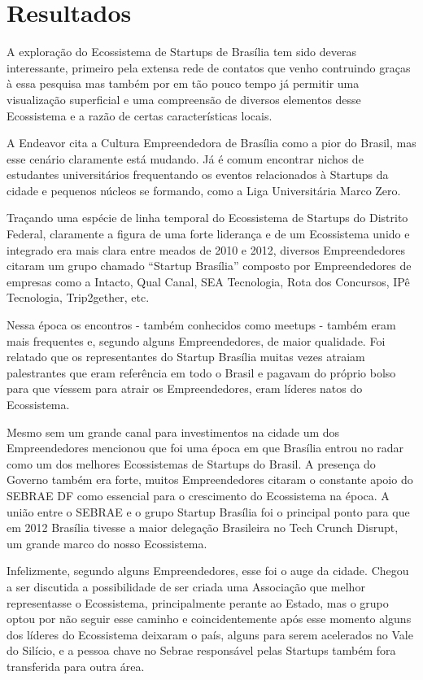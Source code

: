 \chapter[Resultados]{Resultados}
\label{cap-resultados}

A exploração do Ecossistema de Startups de Brasília tem sido deveras interessante, primeiro pela extensa rede de contatos que venho contruindo graças à essa pesquisa mas também por em tão pouco tempo já permitir uma visualização superficial e uma compreensão de diversos elementos desse Ecossistema e a razão de certas características locais.

A Endeavor cita a Cultura Empreendedora de Brasília como a pior do Brasil, mas esse cenário claramente está mudando. Já é comum encontrar nichos de estudantes universitários frequentando os eventos relacionados à Startups da cidade e pequenos núcleos se formando, como a Liga Universitária Marco Zero.

Traçando uma espécie de linha temporal do Ecossistema de Startups do Distrito Federal, claramente a figura de uma forte liderança e de um Ecossistema unido e integrado era mais clara entre meados de 2010 e 2012, diversos Empreendedores citaram um grupo chamado ``Startup Brasília'' composto por Empreendedores de empresas como a Intacto, Qual Canal, SEA Tecnologia, Rota dos Concursos, IPê Tecnologia, Trip2gether, etc. 

Nessa época os encontros - também conhecidos como meetups - também eram mais frequentes e, segundo alguns Empreendedores, de maior qualidade. Foi relatado que os representantes do Startup Brasília muitas vezes atraiam palestrantes que eram referência em todo o Brasil e pagavam do próprio bolso para que víessem para atrair os Empreendedores, eram líderes natos do Ecossistema.

Mesmo sem um grande canal para investimentos na cidade um dos Empreendedores mencionou que foi uma época em que Brasília entrou no radar como um dos melhores Ecossistemas de Startups do Brasil. A presença do Governo também era forte, muitos Empreendedores citaram o constante apoio do SEBRAE DF como essencial para o crescimento do Ecossistema na época. A união entre o SEBRAE e o grupo Startup Brasília foi o principal ponto para que em 2012 Brasília tivesse a maior delegação Brasileira no Tech Crunch Disrupt, um grande marco do nosso Ecossistema. 

Infelizmente, segundo alguns Empreendedores, esse foi o auge da cidade. Chegou a ser discutida a possibilidade de ser criada uma Associação que melhor representasse o Ecossistema, principalmente perante ao Estado, mas o grupo optou por não seguir esse caminho e coincidentemente após esse momento alguns dos líderes do Ecossistema deixaram o país, alguns para serem acelerados no Vale do Silício, e a pessoa chave no Sebrae responsável pelas Startups também fora transferida para outra área. 

